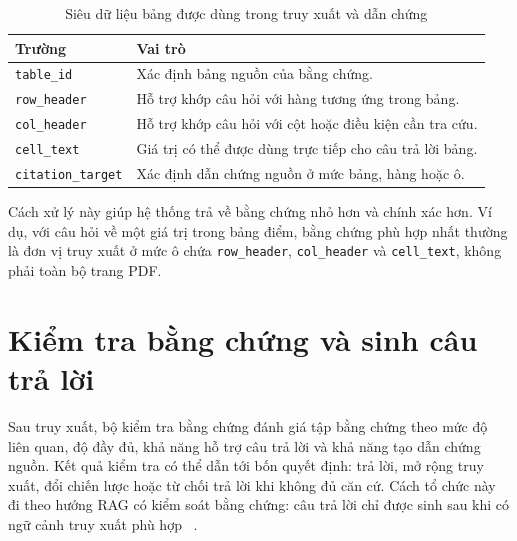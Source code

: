 \documentclass[../DoAn.tex]{subfiles}
\begin{document}
\begin{table}[H]
\centering
\small
\renewcommand{\arraystretch}{1.2}
\caption{Siêu dữ liệu bảng được dùng trong truy xuất và dẫn chứng}
\label{tab:table-query-metadata}
\begin{tabularx}{\textwidth}{
    |>{\raggedright\arraybackslash}p{}
    |>{\raggedright\arraybackslash}X|
}
\hline
\textbf{Trường} & \textbf{Vai trò} \\
\hline
\texttt{table\_id} &
Xác định bảng nguồn của bằng chứng. \\
\hline
\texttt{row\_header} &
Hỗ trợ khớp câu hỏi với hàng tương ứng trong bảng. \\
\hline
\texttt{col\_header} &
Hỗ trợ khớp câu hỏi với cột hoặc điều kiện cần tra cứu. \\
\hline
\texttt{cell\_text} &
Giá trị có thể được dùng trực tiếp cho câu trả lời bảng. \\
\hline
\texttt{citation\_target} &
Xác định dẫn chứng nguồn ở mức bảng, hàng hoặc ô. \\
\hline
\end{tabularx}
\end{table}

Cách xử lý này giúp hệ thống trả về bằng chứng nhỏ hơn và chính xác hơn. Ví dụ,
với câu hỏi về một giá trị trong bảng điểm, bằng chứng phù hợp nhất thường là
đơn vị truy xuất ở mức ô chứa \texttt{row\_header}, \texttt{col\_header} và \texttt{cell\_text}, không
phải toàn bộ trang PDF.

\section{Kiểm tra bằng chứng và sinh câu trả lời}
\label{section:evidence-check-answer-design}

Sau truy xuất, bộ kiểm tra bằng chứng đánh giá tập bằng chứng theo mức độ liên quan, độ
đầy đủ, khả năng hỗ trợ câu trả lời và khả năng tạo dẫn chứng nguồn. Kết quả kiểm tra có
thể dẫn tới bốn quyết định: trả lời, mở rộng truy xuất, đổi chiến lược hoặc từ chối
trả lời khi không đủ căn cứ. Cách tổ chức này đi theo hướng RAG có kiểm soát
bằng chứng: câu trả lời chỉ được sinh sau khi có ngữ cảnh truy xuất phù hợp~
\cite{lewis2020rag,asai2024selfrag}.
\end{document}
